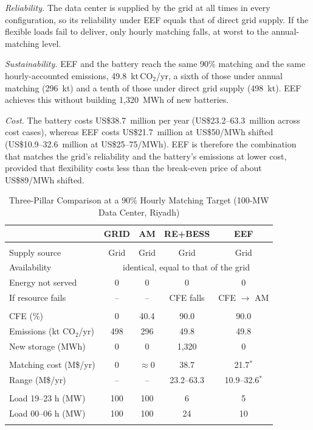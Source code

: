\documentclass[conference]{IEEEtran}
\begin{document}
\emph{Reliability.} The data center is supplied by the grid at all times in every configuration, so its reliability under EEF equals that of direct grid supply. If the flexible loads fail to deliver, only hourly matching falls, at worst to the annual-matching level.

\emph{Sustainability.} EEF and the battery reach the same 90\% matching and the same hourly-accounted emissions, 49.8~kt\,CO$_2$/yr, a sixth of those under annual matching (296~kt) and a tenth of those under direct grid supply (498~kt). EEF achieves this without building 1{,}320~MWh of new batteries.

\emph{Cost.} The battery costs US\$38.7~million per year (US\$23.2--63.3~million across cost cases), whereas EEF costs US\$21.7~million at US\$50/MWh shifted (US\$10.9--32.6~million at US\$25--75/MWh). EEF is therefore the combination that matches the grid's reliability and the battery's emissions at lower cost, provided that flexibility costs less than the break-even price of about US\$89/MWh shifted.

\begin{table}[!t]
\centering
\caption{Three-Pillar Comparison at a 90\% Hourly Matching Target (100-MW Data Center, Riyadh)}
\label{tab:pillars}
\footnotesize
\setlength{\tabcolsep}{3pt}
\begin{tabular}{@{}>{\raggedright\arraybackslash}p{2.6cm}cccc@{}}
\toprule
 & GRID & AM & RE+BESS & EEF \\
\midrule
\multicolumn{5}{@{}l}{\emph{Reliability of the data center}} \\
Supply source & Grid & Grid & Grid & Grid \\
Availability & \multicolumn{4}{c}{identical, equal to that of the grid} \\
Energy not served & 0 & 0 & 0 & 0 \\
If resource fails & -- & -- & CFE falls & CFE $\to$ AM \\
\midrule
\multicolumn{5}{@{}l}{\emph{Sustainability}} \\
CFE (\%) & 0 & 40.4 & 90.0 & 90.0 \\
Emissions (kt CO$_2$/yr) & 498 & 296 & 49.8 & 49.8 \\
New storage (MWh) & 0 & 0 & 1{,}320 & 0 \\
\midrule
\multicolumn{5}{@{}l}{\emph{Cost}} \\
Matching cost (M\$/yr) & 0 & ${\approx}0$ & 38.7 & 21.7$^\ast$ \\
Range (M\$/yr) & -- & -- & 23.2--63.3 & 10.9--32.6$^\ast$ \\
\midrule
\multicolumn{5}{@{}l}{\emph{Additional: impact on the grid}} \\
Load 19--23 h (MW) & 100 & 100 & 6 & 5 \\
Load 00--06 h (MW) & 100 & 100 & 24 & 10 \\
\bottomrule
\multicolumn{5}{@{}p{8.2cm}@{}}{\scriptsize $^\ast$At US\$50 (25--75) per MWh shifted. Load: load added to the grid by the data center and its resources. PV is sold at a price that recovers its cost, so AM adds no net cost. Emissions use the hourly unmatched energy and 0.568~tCO$_2$/MWh~\cite{kfupmghg}.}
\end{tabular}
\end{table}
\end{document}
